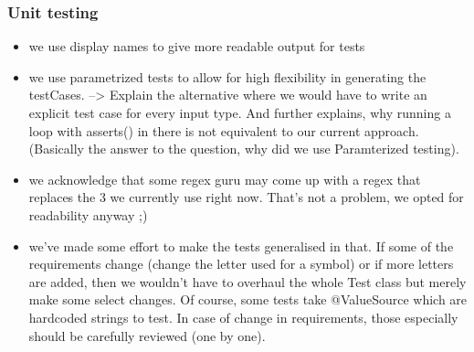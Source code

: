 \subsubsection{Unit testing}

\begin{itemize}
	\item we use display names to give more readable output for tests
	\item we use parametrized tests to allow for high flexibility in generating the testCases. --> Explain the alternative where we would have to write an explicit test case for every input type. And further explains, why running a loop with asserts() in there is not equivalent to our current approach. (Basically the answer to the question, why did we use Paramterized testing). 
	\item we acknowledge that some regex guru may come up with a regex that replaces the 3 we currently use right now. That's not a problem, we opted for readability anyway ;) 
	\item we've made some effort to make the tests generalised in that. If some of the requirements change (change the letter used for a symbol) or if more letters are added, then we wouldn't have to overhaul the whole Test class but merely make some select changes. Of course, some tests take @ValueSource which are hardcoded strings to test. In case of change in requirements, those especially should be carefully reviewed (one by one). 
\end{itemize}
